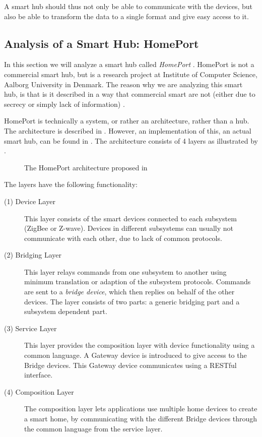 A smart hub should thus not only be able to communicate with the devices, 
but also be able to transform the data to a single format and give easy access to it.

\subsection{Analysis of a Smart Hub: HomePort}\label{sec:homeport}
In this section we will analyze a smart hub called \emph{HomePort} \cite{HOMEPORT10}.
HomePort is not a commercial smart hub, 
but is a research project at Institute of Computer Science, Aalborg University in Denmark. 
The reason why we are analyzing this smart hub, 
is that is it described in a way that commercial smart are not (either due to secrecy or simply lack of information) \cite{HOMEPORT09, HOMEPORT10, HOMEPORT13}.  

HomePort is technically a system, or rather an architecture, rather than a hub. 
The architecture is described in \cite{HOMEPORT10}. 
However, an implementation of this, \ie an actual smart hub, can be found in \cite{HOMEPORT13}. 
The architecture consists of \num{4} layers as illustrated by .

\begin{figure}[!htb]
    \centering
    
    \caption{The HomePort architecture proposed in \protect\cite{HOMEPORT10}}
    \label{fig:homeport}
\end{figure}

The layers have the following functionality:
\begin{description}
    \item[(1) Device Layer] This layer consists of the smart devices connected to each subsystem (\eg ZigBee or Z-wave). Devices in different subsystems can usually not communicate with each other, due to lack of common protocols.
    \item[(2) Bridging Layer] This layer relays commands from one subsystem to another using minimum translation or adaption of the subsystem protocols. Commands are sent to a \emph{bridge device}, which then replies on behalf of the other devices. The layer consists of two parts: a generic bridging part and a subsystem dependent part. 
    \item[(3) Service Layer] This layer provides the composition layer with device functionality using a common language. A Gateway device is introduced to give access to the Bridge devices. This Gateway device communicates using a RESTful interface. 
    \item[(4) Composition Layer] The composition layer lets applications use multiple home devices to create a smart home, by communicating with the different Bridge devices through the common language from the service layer. 
\end{description}

